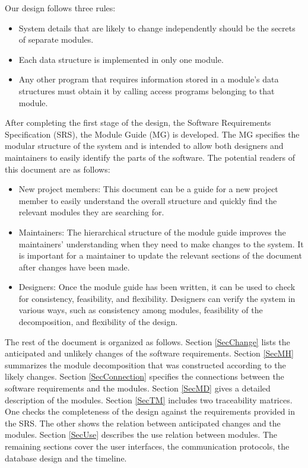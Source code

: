 \documentclass[12pt, titlepage]{article}
\begin{document}
Our design follows three rules:
\begin{itemize}
\item System details that are likely to change independently should be the
  secrets of separate modules.
\item Each data structure is implemented in only one module.
\item Any other program that requires information stored in a module's data
  structures must obtain it by calling access programs belonging to that module.
\end{itemize}

After completing the first stage of the design, the Software Requirements
Specification (SRS), the Module Guide (MG) is developed. The MG
specifies the modular structure of the system and is intended to allow both
designers and maintainers to easily identify the parts of the software.  The
potential readers of this document are as follows:

\begin{itemize}
\item New project members: This document can be a guide for a new project member
  to easily understand the overall structure and quickly find the
  relevant modules they are searching for.
\item Maintainers: The hierarchical structure of the module guide improves the
  maintainers' understanding when they need to make changes to the system. It is
  important for a maintainer to update the relevant sections of the document
  after changes have been made.
\item Designers: Once the module guide has been written, it can be used to
  check for consistency, feasibility, and flexibility. Designers can verify the
  system in various ways, such as consistency among modules, feasibility of the
  decomposition, and flexibility of the design.
\end{itemize}

The rest of the document is organized as follows. Section
\ref{SecChange} lists the anticipated and unlikely changes of the software
requirements. Section \ref{SecMH} summarizes the module decomposition that
was constructed according to the likely changes. Section \ref{SecConnection}
specifies the connections between the software requirements and the
modules. Section \ref{SecMD} gives a detailed description of the
modules. Section \ref{SecTM} includes two traceability matrices. One checks
the completeness of the design against the requirements provided in the SRS. The
other shows the relation between anticipated changes and the modules. Section
\ref{SecUse} describes the use relation between modules. The remaining sections
cover the user interfaces, the communication protocols, the database design and
the timeline.
\end{document}
